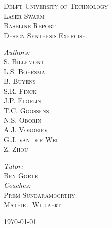 \begin{titlepage}
\begin{center}

\textsc{\LARGE Delft University of Technology}\\[1.5cm]

\textsc{\Huge Laser Swarm}\\[0.5cm]
\textsc{\small Baseline Report}\\[1.5cm]
\textsc{\large Design Synthesis Exercise}\\[2.5cm]

\begin{minipage}{0.4\textwidth}
\begin{flushleft} \large
\emph{Authors:}\\
\textsc{S. Billemont\\
L.S. Boersma\\
B. Buyens\\
S.R. Finck\\
J.P. Florijn\\
T.C. Goossens\\
N.S. Oborin\\
A.J. Vorobiev\\
G.J. van der Wel\\
Z. Zhou\\}
\end{flushleft}
\end{minipage}
\begin{minipage}{0.4\textwidth}
\begin{flushright}
\emph{Tutor:}\\
\textsc{Ben Gorte}\\[1cm]
\emph{Coaches:}\\
\textsc{Prem Sundaramoorthy\\
Mathieu Willaert}
\end{flushright}
\end{minipage}
\vfill

\today
\end{center}
\end{titlepage}